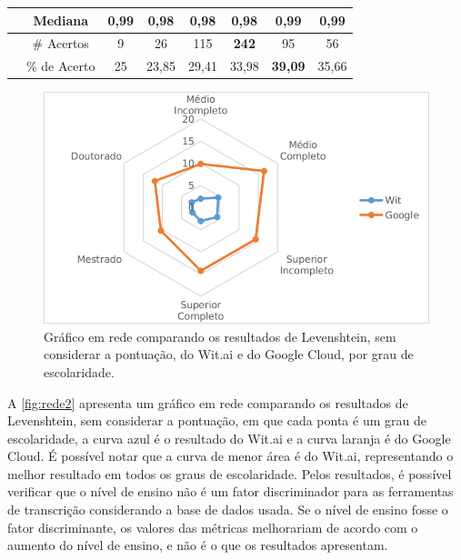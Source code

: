 \begin{quadro}[h]
\begin{tabular}{c|c|c|c|c|c|c|c|}
\multicolumn{1}{|c|}{}                                                                                   & Mediana      & \textbf{0,99}                                       & 0,98                                                 & 0,98                                                   & 0,98                                                    & \textbf{0,99}  & \textbf{0,99} \\ \hline
\multicolumn{1}{l|}{}                                                                                    & \# Acertos   & 9                                                   & 26                                                   & 115                                                    & \textbf{242}                                            & 95             & 56            \\ \cline{2-8} 
\multicolumn{1}{l|}{}                                                                                    & \% de Acerto & 25                                                  & 23,85                                                & 29,41                                                  & 33,98                                                   & \textbf{39,09} & 35,66         \\ \cline{2-8} 
\end{tabular}
\end{quadro}
\FloatBarrier

\begin{figure}[h!]
\centering
\caption{Gráfico em rede comparando os resultados de Levenshtein, sem considerar a pontuação, do Wit.ai e do Google Cloud, por grau de escolaridade.}
\label{fig:rede2}
\includegraphics[width=.75\textwidth]{images/Lev_grau_sempont.png}
\end{figure}

A \autoref{fig:rede2} apresenta um gráfico em rede comparando os resultados de Levenshtein, sem considerar a pontuação, em que cada ponta é um grau de escolaridade, a curva azul é o resultado do Wit.ai e a curva laranja é do Google Cloud. É possível notar que a curva de menor área é do Wit.ai, representando o melhor resultado em todos os graus de escolaridade. 
Pelos resultados, é possível verificar que o nível de ensino não é um fator discriminador para as ferramentas de transcrição considerando a base de dados usada. Se o nível de ensino fosse o fator discriminante, os valores das métricas melhorariam de acordo com o aumento do nível de ensino, e não é o que os resultados apresentam. 


